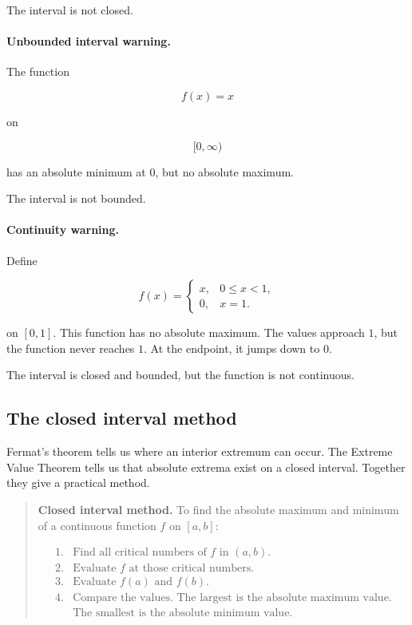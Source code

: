 The interval is not closed.

\paragraph{Unbounded interval warning.}
The function

\[
f(x)=x
\]

on

\[
[0,\infty)
\]

has an absolute minimum at \(0\), but no absolute maximum.

The interval is not bounded.

\paragraph{Continuity warning.}
Define

\[
f(x)=
\begin{cases}
x, & 0\le x<1,\\
0, & x=1.
\end{cases}
\]

on \([0,1]\).  This function has no absolute maximum.  The values approach \(1\),
but the function never reaches \(1\).  At the endpoint, it jumps down to \(0\).

The interval is closed and bounded, but the function is not continuous.

\subsection{The closed interval method}
\label{subsec:closed-interval-method-procedure}

Fermat's theorem tells us where an interior extremum can occur.  The Extreme Value
Theorem tells us that absolute extrema exist on a closed interval.  Together they
give a practical method.

\begin{quote}
\textbf{Closed interval method.}
To find the absolute maximum and minimum of a continuous function \(f\) on
\([a,b]\):

\[
\begin{array}{ll}
\text{1.} & \text{Find all critical numbers of } f \text{ in } (a,b).\\
\text{2.} & \text{Evaluate } f \text{ at those critical numbers.}\\
\text{3.} & \text{Evaluate } f(a) \text{ and } f(b).\\
\text{4.} & \text{Compare the values.  The largest is the absolute maximum value.}\\
          & \text{The smallest is the absolute minimum value.}
\end{array}
\]
\end{quote}

